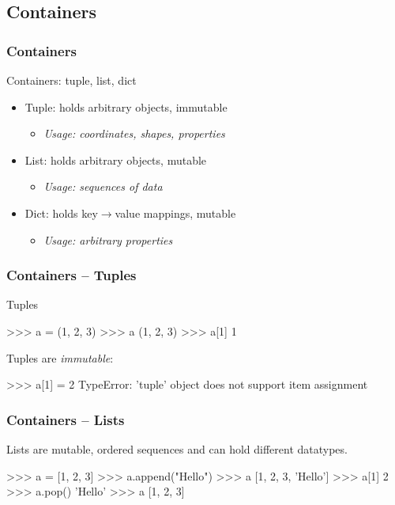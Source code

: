 \documentclass[xetex,10pt]{beamer}
\begin{document}
\subsection{Containers}

\begin{frame}[fragile]
	\frametitle{Containers}

	Containers: tuple, list, dict

	\vspace*{1em}

	\begin{itemize}
	\item Tuple: holds arbitrary objects, immutable
		\begin{itemize}
		\item \emph{Usage: coordinates, shapes, properties}
		\end{itemize}
	\item List: holds arbitrary objects, mutable
		\begin{itemize}
		\item \emph{Usage: sequences of data}
		\end{itemize}
	\item Dict: holds key$\rightarrow$value mappings, mutable
		\begin{itemize}
		\item \emph{Usage: arbitrary properties}
		\end{itemize}
	\end{itemize}
	
\end{frame}

\begin{frame}[fragile]
	\frametitle{Containers -- Tuples}

Tuples
\begin{python}
>>> a = (1, 2, 3)
>>> a
(1, 2, 3)
>>> a[1]
1
\end{python}

	\vspace*{1em}


Tuples are \emph{immutable}:
\begin{python}
>>> a[1] = 2
TypeError: 'tuple' object does not support item assignment
\end{python}
\end{frame}

\begin{frame}[fragile]
	\frametitle{Containers -- Lists}

Lists are mutable, ordered sequences and can hold different datatypes.
\begin{python}
>>> a = [1, 2, 3]
>>> a.append("Hello")
>>> a
[1, 2, 3, 'Hello']
>>> a[1]
2
>>> a.pop()
'Hello'
>>> a
[1, 2, 3]
\end{python}

\end{frame}
\end{document}
